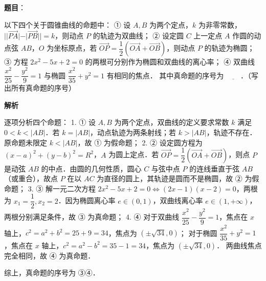 \begin{answer}

\textbf{题目}：

以下四个关于圆锥曲线的命题中：
① 设 $A, B$ 为两个定点，$k$ 为非零常数，$||\vec{PA}| - |\vec{PB}|| = k$，则动点 $P$ 的轨迹为双曲线；
② 设定圆 $C$ 上一定点 $A$ 作圆的动点弦 $AB$，$O$ 为坐标原点，若 $\vec{OP} = \dfrac{1}{2}(\vec{OA} + \vec{OB})$，则动点 $P$ 的轨迹为椭圆；
③ 方程 $2x^2 - 5x + 2 = 0$ 的两根可分别作为椭圆和双曲线的离心率；
④ 双曲线 $\dfrac{x^2}{25} - \dfrac{y^2}{9} = 1$ 与椭圆 $\dfrac{x^2}{35} + y^2 = 1$ 有相同的焦点．
其中真命题的序号为 $\underline{\hspace{2em}}$．（写出所有真命题的序号）

\textbf{解析}

逐项分析四个命题：
1. ① 设 $A, B$ 为两个定点，双曲线的定义要求常数 $k$ 满足 $0 < k < |AB|$．若 $k = |AB|$，动点轨迹为两条射线；若 $k > |AB|$，轨迹不存在．原命题未限定 $k < |AB|$，故 ① 为假命题；
2. ② 设定圆方程为 $(x - a)^2 + (y - b)^2 = R^2$，$A$ 为圆上定点．若 $\vec{OP} = \dfrac{1}{2}(\vec{OA} + \vec{OB})$，则点 $P$ 是动弦 $AB$ 的中点．由圆的几何性质，圆心 $C$ 与弦中点 $P$ 的连线垂直于弦 $AB$（或重合），故点 $P$ 在以 $AC$ 为直径的圆上，其轨迹是圆而不是椭圆，故 ② 为假命题；
3. ③ 解一元二次方程 $2x^2 - 5x + 2 = 0 \iff (2x - 1)(x - 2) = 0$，两根为 $x_1 = \dfrac{1}{2}, x_2 = 2$．因为椭圆离心率 $e \in (0, 1)$，双曲线离心率 $e \in (1, +\infty)$，两根分别满足条件，故 ③ 为真命题；
4. ④ 对于双曲线 $\dfrac{x^2}{25} - \dfrac{y^2}{9} = 1$，焦点在 $x$ 轴上，$c^2 = a^2 + b^2 = 25 + 9 = 34$，焦点为 $(\pm\sqrt{34}, 0)$；
   对于椭圆 $\dfrac{x^2}{35} + y^2 = 1$，焦点在 $x$ 轴上，$c^2 = a^2 - b^2 = 35 - 1 = 34$，焦点为 $(\pm\sqrt{34}, 0)$．
   两曲线焦点完全相同，故 ④ 为真命题．

综上，真命题的序号为 ③④．


\end{answer}
